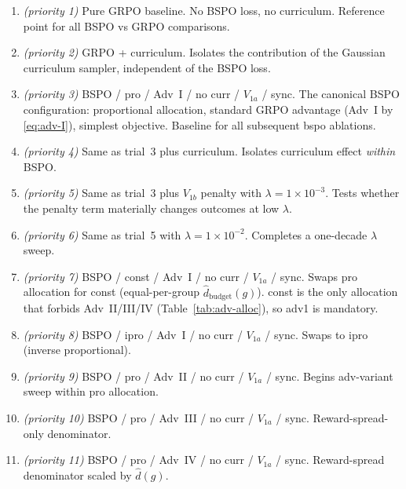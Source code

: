 \documentclass[11pt]{article}
\newcommand{\dbudget}{\hat d_{\text{budget}}}
\begin{document}
\begin{enumerate}[label=\textbf{Trial \arabic*}., wide=0pt]

\item \emph{(priority 1)} Pure GRPO baseline. No BSPO loss, no
  curriculum. Reference point for all BSPO vs GRPO comparisons.

\item \emph{(priority 2)} GRPO + curriculum. Isolates the
  contribution of the Gaussian curriculum sampler, independent of the
  BSPO loss.

\item \emph{(priority 3)} BSPO / \textsf{pro} / Adv~I / no curr /
  $V_{1a}$ / sync. The canonical BSPO configuration: proportional
  allocation, standard GRPO advantage (Adv~I by
  \eqref{eq:adv-I}), simplest objective. Baseline for all
  subsequent bspo ablations.

\item \emph{(priority 4)} Same as trial~3 plus curriculum. Isolates
  curriculum effect \emph{within} BSPO.

\item \emph{(priority 5)} Same as trial~3 plus $V_{1b}$ penalty with
  $\lambda = 1\!\times\!10^{-3}$. Tests whether the penalty term
  materially changes outcomes at low $\lambda$.

\item \emph{(priority 6)} Same as trial~5 with $\lambda =
  1\!\times\!10^{-2}$. Completes a one-decade $\lambda$ sweep.

\item \emph{(priority 7)} BSPO / \textsf{const} / Adv~I / no curr /
  $V_{1a}$ / sync. Swaps \textsf{pro} allocation for \textsf{const}
  (equal-per-group $\dbudget(g)$). const is the only allocation that
  forbids Adv~II/III/IV (Table~\ref{tab:adv-alloc}), so adv1 is
  mandatory.

\item \emph{(priority 8)} BSPO / \textsf{ipro} / Adv~I / no curr /
  $V_{1a}$ / sync. Swaps to \textsf{ipro} (inverse proportional).

\item \emph{(priority 9)} BSPO / \textsf{pro} / Adv~II / no curr /
  $V_{1a}$ / sync. Begins adv-variant sweep within pro allocation.

\item \emph{(priority 10)} BSPO / \textsf{pro} / Adv~III / no curr /
  $V_{1a}$ / sync. Reward-spread-only denominator.

\item \emph{(priority 11)} BSPO / \textsf{pro} / Adv~IV / no curr /
  $V_{1a}$ / sync. Reward-spread denominator scaled by $\hat d(g)$.


\end{enumerate}
\end{document}
